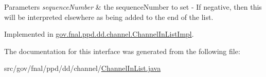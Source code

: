 \begin{DoxyParams}{Parameters}
{\em sequence\-Number} & the sequence\-Number to set -\/ If negative, then this will be interpreted elsewhere as being added to the end of the list. \\
\hline
\end{DoxyParams}


Implemented in \hyperlink{classgov_1_1fnal_1_1ppd_1_1dd_1_1channel_1_1ChannelInListImpl_a3d7875d359431d5e2dc13b60db55cf72}{gov.\-fnal.\-ppd.\-dd.\-channel.\-Channel\-In\-List\-Impl}.



The documentation for this interface was generated from the following file\-:\begin{DoxyCompactItemize}
\item 
src/gov/fnal/ppd/dd/channel/\hyperlink{ChannelInList_8java}{Channel\-In\-List.\-java}\end{DoxyCompactItemize}
